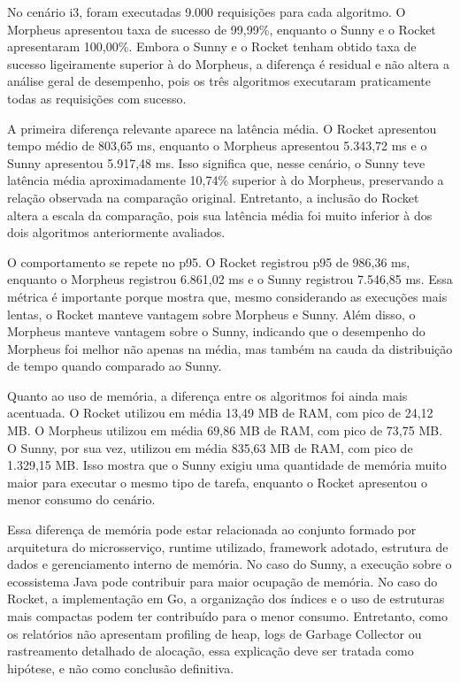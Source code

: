 No cenário i3, foram executadas 9.000 requisições para cada algoritmo. O Morpheus apresentou taxa de sucesso de 99,99\%, enquanto o Sunny e o Rocket apresentaram 100,00\%. Embora o Sunny e o Rocket tenham obtido taxa de sucesso ligeiramente superior à do Morpheus, a diferença é residual e não altera a análise geral de desempenho, pois os três algoritmos executaram praticamente todas as requisições com sucesso.

A primeira diferença relevante aparece na latência média. O Rocket apresentou tempo médio de 803,65 ms, enquanto o Morpheus apresentou 5.343,72 ms e o Sunny apresentou 5.917,48 ms. Isso significa que, nesse cenário, o Sunny teve latência média aproximadamente 10,74\% superior à do Morpheus, preservando a relação observada na comparação original. Entretanto, a inclusão do Rocket altera a escala da comparação, pois sua latência média foi muito inferior à dos dois algoritmos anteriormente avaliados.

O comportamento se repete no p95. O Rocket registrou p95 de 986,36 ms, enquanto o Morpheus registrou 6.861,02 ms e o Sunny registrou 7.546,85 ms. Essa métrica é importante porque mostra que, mesmo considerando as execuções mais lentas, o Rocket manteve vantagem sobre Morpheus e Sunny. Além disso, o Morpheus manteve vantagem sobre o Sunny, indicando que o desempenho do Morpheus foi melhor não apenas na média, mas também na cauda da distribuição de tempo quando comparado ao Sunny.

Quanto ao uso de memória, a diferença entre os algoritmos foi ainda mais acentuada. O Rocket utilizou em média 13,49 MB de RAM, com pico de 24,12 MB. O Morpheus utilizou em média 69,86 MB de RAM, com pico de 73,75 MB. O Sunny, por sua vez, utilizou em média 835,63 MB de RAM, com pico de 1.329,15 MB. Isso mostra que o Sunny exigiu uma quantidade de memória muito maior para executar o mesmo tipo de tarefa, enquanto o Rocket apresentou o menor consumo do cenário.

Essa diferença de memória pode estar relacionada ao conjunto formado por arquitetura do microsserviço, runtime utilizado, framework adotado, estrutura de dados e gerenciamento interno de memória. No caso do Sunny, a execução sobre o ecossistema Java pode contribuir para maior ocupação de memória. No caso do Rocket, a implementação em Go, a organização dos índices e o uso de estruturas mais compactas podem ter contribuído para o menor consumo. Entretanto, como os relatórios não apresentam profiling de heap, logs de Garbage Collector ou rastreamento detalhado de alocação, essa explicação deve ser tratada como hipótese, e não como conclusão definitiva.

